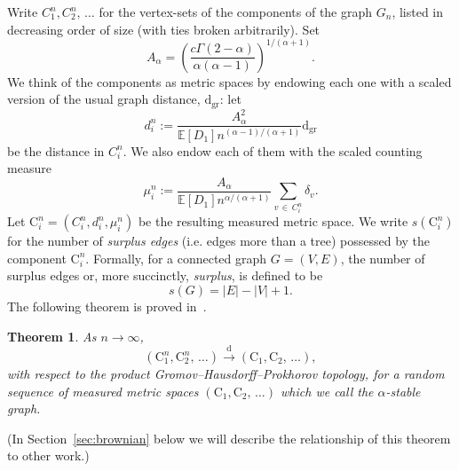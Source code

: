 \documentclass[10pt]{amsart}
\newtheorem{theo}{Theorem}[section]
\theoremstyle{definition}\newtheorem{defi}[theo]{Definition}\newtheorem{rema}[theo]{Remark}\newtheorem{exam}[theo]{Example}\newtheorem{exem}[theo]{Example}\newtheorem{nota}[theo]{Notation}
\newcommand{\convdist}{\ensuremath{\overset{\mathrm{d}}{\rightarrow}}}
\newcommand{\gr}{\mathrm{gr}}
\newcommand{\rmd}{\mathrm{d}}
\newcommand{\rmC}{\mathrm{C}}
\newcommand{\bbE}{\mathbb{E}}
\begin{document}
Write $C_1^n, C_2^n,\,\ldots$ for the vertex-sets of the components of the graph $G_n$, listed in decreasing order of size (with ties broken arbitrarily). Set
\begin{equation}\label{A_alpha}
A_{\alpha} =\left(\frac{c \Gamma(2-\alpha)}{\alpha(\alpha-1)}\right)^{1/(\alpha+1)}.
\end{equation}
We think of the components as metric spaces by endowing each one with a scaled version of the usual graph distance, $\rmd_{\gr}$: let
\[
d_i^n := \frac{A_{\alpha}^2}{\bbE[D_1] n^{(\alpha-1)/(\alpha+1)}} \rmd_{\gr}
\]
be the distance in $C_i^n$. We also endow each of them with the scaled counting measure
\[
\mu_i^n := \frac{A_{\alpha}}{\bbE[D_1] n^{\alpha/(\alpha+1)}} \sum_{v\,\in\,C_i^n} \delta_v.
\]
Let $\rmC_i^n = (C_i^n, d_i^n, \mu_i^n)$ be the resulting measured metric space. We write $s(\rmC^n_i)$ for the number of \emph{surplus edges} (i.e. edges more than a tree) possessed by the component $\rmC^n_i$. Formally, for a connected graph $G=(V,E)$, the number of surplus edges or, more succinctly, \emph{surplus}, is defined to be
\[
s(G)=|E|-|V|+1.
\]
The following theorem is proved in~\cite{CKG17+}.

\begin{theo}\label{th:C-K+G}
As $n \to \infty$,
\[
\left(\rmC_1^n, \rmC_2^n,\,\ldots\right) \convdist \left(\rmC_1, \rmC_2,\,\ldots\right),
\]
with respect to the product Gromov--Hausdorff--Prokhorov topology, for a random sequence of measured metric spaces $(\rmC_1, \rmC_2,\,\ldots)$ which we call the \emph{$\alpha$-stable graph}.
\end{theo}

(In Section~\ref{sec:brownian} below we will describe the relationship of this theorem to other work.)
\end{document}
